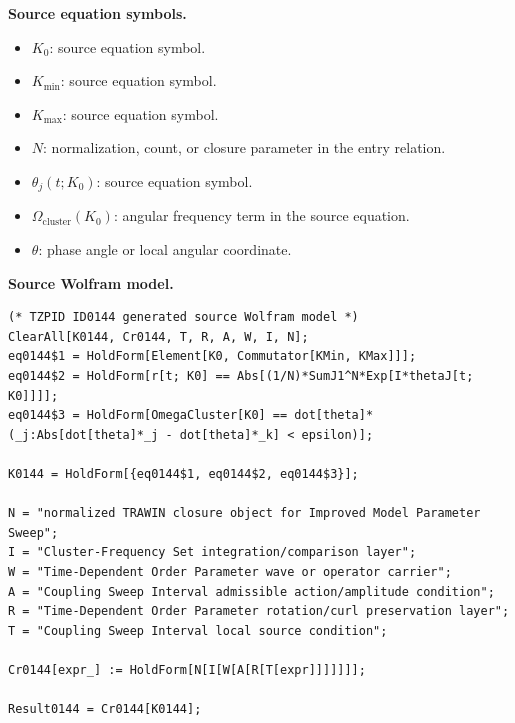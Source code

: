 \begin{minipage}[t]{0.49\linewidth}
\begingroup
\small
\raggedright
\textbf{Source equation symbols.}\par
\begin{itemize}[leftmargin=1.35em,itemsep=1pt,topsep=1pt,parsep=0pt]
    \item $K_0$: source equation symbol.
    \item $K_{\min}$: source equation symbol.
    \item $K_{\max}$: source equation symbol.
    \item $N$: normalization, count, or closure parameter in the entry relation.
    \item $\theta_j(t;K_0)$: source equation symbol.
    \item $\Omega_{\mathrm{cluster}}(K_0)$: angular frequency term in the source equation.
    \item $\theta$: phase angle or local angular coordinate.
\end{itemize}
\endgroup
\end{minipage}\hfill
\begin{minipage}[t]{0.47\linewidth}
\begingroup
\scriptsize
\raggedright
\textbf{Source Wolfram model.}\par
\begin{Verbatim}[fontsize=\tiny,breaklines=true,breakanywhere=true]
(* TZPID ID0144 generated source Wolfram model *)
ClearAll[K0144, Cr0144, T, R, A, W, I, N];
eq0144$1 = HoldForm[Element[K0, Commutator[KMin, KMax]]];
eq0144$2 = HoldForm[r[t; K0] == Abs[(1/N)*SumJ1^N*Exp[I*thetaJ[t; K0]]]];
eq0144$3 = HoldForm[OmegaCluster[K0] == dot[theta]*(_j:Abs[dot[theta]*_j - dot[theta]*_k] < epsilon)];

K0144 = HoldForm[{eq0144$1, eq0144$2, eq0144$3}];

N = "normalized TRAWIN closure object for Improved Model Parameter Sweep";
I = "Cluster-Frequency Set integration/comparison layer";
W = "Time-Dependent Order Parameter wave or operator carrier";
A = "Coupling Sweep Interval admissible action/amplitude condition";
R = "Time-Dependent Order Parameter rotation/curl preservation layer";
T = "Coupling Sweep Interval local source condition";

Cr0144[expr_] := HoldForm[N[I[W[A[R[T[expr]]]]]]];

Result0144 = Cr0144[K0144];
\end{Verbatim}
\endgroup
\end{minipage}

